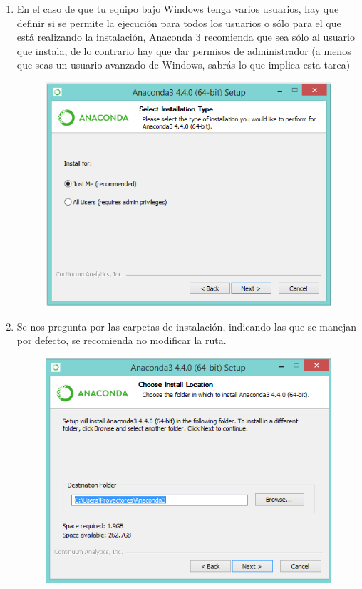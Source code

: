 \documentclass[12pt]{article}
\begin{document}
\begin{enumerate}
\item En el caso de que tu equipo bajo Windows tenga varios usuarios, hay que definir si se permite la ejecución para todos los usuarios o sólo para el que está realizando la instalación, Anaconda 3 recomienda que sea sólo al usuario que instala, de lo contrario hay que dar permisos de administrador (a menos que seas un usuario avanzado de Windows, sabrás lo que implica esta tarea)
\begin{figure}[H]
	\centering
	\includegraphics[scale=0.5]{Imagenes/Instalacion_Anaconda_Windows_05} 
\end{figure}
\item Se nos pregunta por las carpetas de instalación, indicando las que se manejan por defecto, se recomienda no modificar la ruta.
\begin{figure}[H]
	\centering
	\includegraphics[scale=0.5]{Imagenes/Instalacion_Anaconda_Windows_06} 

\end{figure}
\end{enumerate}
\end{document}
